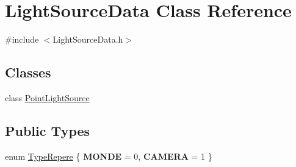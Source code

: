 \hypertarget{classLightSourceData}{}\section{Light\+Source\+Data Class Reference}
\label{classLightSourceData}


{\ttfamily \#include $<$Light\+Source\+Data.\+h$>$}

\subsection*{Classes}
\begin{DoxyCompactItemize}
\item 
class \mbox{\hyperlink{classLightSourceData_1_1PointLightSource}{Point\+Light\+Source}}
\end{DoxyCompactItemize}
\subsection*{Public Types}
\begin{DoxyCompactItemize}
\item 
enum \mbox{\hyperlink{classLightSourceData_abdbcb37900b8147487551a3afcdd90f5}{Type\+Repere}} \{ {\bfseries M\+O\+N\+DE} = 0, 
{\bfseries C\+A\+M\+E\+RA} = 1
 \}
\end{DoxyCompactItemize}
